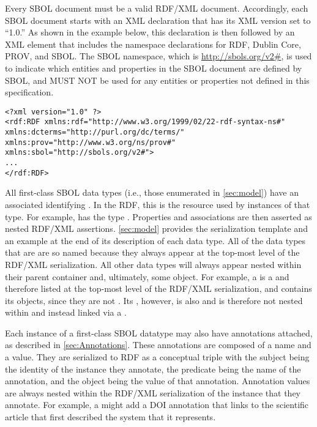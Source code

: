 Every SBOL document must be a valid RDF/XML document. Accordingly, each SBOL document starts with an XML declaration that has its XML version set to ``1.0.'' As shown in the example below, this declaration is then followed by an  XML element that includes the namespace declarations for RDF, Dublin Core, PROV, and SBOL. The SBOL namespace, which is \url{http://sbols.org/v2#}, is used to indicate which entities and properties in the SBOL document are defined by SBOL, and MUST NOT be used for any entities or properties not defined in this specification.
\label{xml-namespace}

\begin{lstlisting}
<?xml version="1.0" ?>
<rdf:RDF xmlns:rdf="http://www.w3.org/1999/02/22-rdf-syntax-ns#" xmlns:dcterms="http://purl.org/dc/terms/" xmlns:prov="http://www.w3.org/ns/prov#" xmlns:sbol="http://sbols.org/v2#">
...
</rdf:RDF>
\end{lstlisting}

All first-class SBOL data types (i.e., those enumerated in \ref{sec:model}) have an associated identifying . In the RDF, this is the resource  used by instances of that type. For example,  has the
type  .
Properties and associations are then asserted as nested RDF/XML assertions. 
\ref{sec:model} provides the serialization template and an example at the end of its description of each data type.
All of the data types that are  are so named because they always appear at the top-most level of the RDF/XML serialization. All other data types will always appear nested within their parent container and, ultimately, some  object.
For example, a  is a  and therefore listed at the top-most level of the RDF/XML serialization, and contains its   objects, since they are not .  Its , however, is also  and is therefore not nested within and instead linked via a .

Each instance of a first-class SBOL datatype may also have annotations attached, as described in \ref{sec:Annotations}. These annotations are composed of a name and a value.  They are serialized to RDF as a conceptual triple with the subject being the identity of the instance they annotate, the predicate being the name of the annotation, and the object being the value of that annotation. Annotation values are always nested within the RDF/XML serialization of the instance that they annotate.
For example, a  might add a DOI annotation that links to the scientific article that first described the system that it represents.

